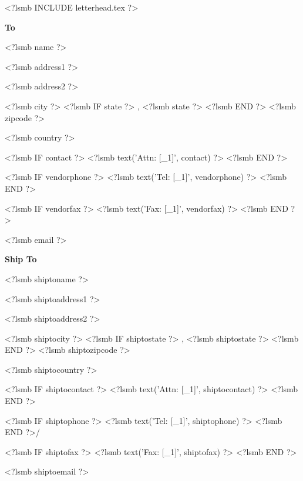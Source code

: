 \documentclass{scrartcl}
\begin{document}
\pagestyle{myheadings}
\thispagestyle{empty}

<?lsmb INCLUDE letterhead.tex ?>



\vspace*{0.5cm}

\parbox[t]{.5\textwidth}{
\textbf{To}
\vspace{0.3cm}
  
<?lsmb name ?>

<?lsmb address1 ?>

<?lsmb address2 ?>

<?lsmb city ?>
<?lsmb IF state ?>
\hspace{-0.1cm}, <?lsmb state ?>
<?lsmb END ?>
<?lsmb zipcode ?>

<?lsmb country ?>

\vspace{0.3cm}

<?lsmb IF contact ?>
<?lsmb text('Attn: [_1]', contact) ?>
\vspace{0.2cm}
<?lsmb END ?>

<?lsmb IF vendorphone ?>
<?lsmb text('Tel: [_1]', vendorphone) ?>
<?lsmb END ?>

<?lsmb IF vendorfax ?>
<?lsmb text('Fax: [_1]', vendorfax) ?>
<?lsmb END ?>

<?lsmb email ?>
}
\parbox[t]{.5\textwidth}{
\textbf{Ship To}
\vspace{0.3cm}

<?lsmb shiptoname ?>

<?lsmb shiptoaddress1 ?>

<?lsmb shiptoaddress2 ?>

<?lsmb shiptocity ?>
<?lsmb IF shiptostate ?>
\hspace{-0.1cm}, <?lsmb shiptostate ?>
<?lsmb END ?>
<?lsmb shiptozipcode ?>

<?lsmb shiptocountry ?>

\vspace{0.3cm}

<?lsmb IF shiptocontact ?>
<?lsmb text('Attn: [_1]', shiptocontact) ?>
\vspace{0.2cm}
<?lsmb END ?>

<?lsmb IF shiptophone ?>
<?lsmb text('Tel: [_1]', shiptophone) ?>
<?lsmb END ?>/

<?lsmb IF shiptofax ?>
<?lsmb text('Fax: [_1]', shiptofax) ?>
<?lsmb END ?>

<?lsmb shiptoemail ?>
}
\hfill
\end{document}
